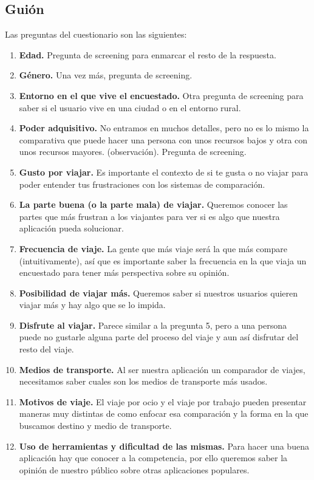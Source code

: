 \subsection{Guión}
Las preguntas del cuestionario son las siguientes:
\begin{enumerate}
    \item\textbf{Edad.} Pregunta de screening para enmarcar el resto de la respuesta.
    \item\textbf{Género.} Una vez más, pregunta de screening.
    \item\textbf{Entorno en el que vive el encuestado.} Otra pregunta de screening para saber si el usuario vive en una ciudad o en el entorno rural.
    \item\textbf{Poder adquisitivo.} No entramos en muchos detalles, pero no es lo mismo la comparativa que puede hacer una persona con unos recursos bajos y otra con unos recursos mayores. (observación). Pregunta de screening.
    \item\textbf{Gusto por viajar.} Es importante el contexto de si te gusta o no viajar para poder entender tus frustraciones con los sistemas de comparación.
    \item\textbf{La parte buena (o la parte mala) de viajar.} Queremos conocer las partes que más frustran a los viajantes para ver si es algo que nuestra aplicación pueda solucionar.
    \item\textbf{Frecuencia de viaje.} La gente que más viaje será la que más compare (intuitivamente), así que es importante saber la frecuencia en la que viaja un encuestado para tener más perspectiva sobre su opinión.
    \item\textbf{Posibilidad de viajar más.} Queremos saber si nuestros usuarios quieren viajar más y hay algo que se lo impida.
    \item\textbf{Disfrute al viajar.} Parece similar a la  pregunta 5, pero a una persona puede no gustarle alguna parte del proceso del viaje y aun así disfrutar del resto del viaje.
    \item\textbf{Medios de transporte.} Al ser nuestra aplicación un comparador de viajes, necesitamos saber cuales son los medios de transporte más usados.
    \item\textbf{Motivos de viaje.} El viaje por ocio y el viaje por trabajo pueden presentar maneras muy distintas de como enfocar esa comparación y la forma en la que buscamos destino y medio de transporte.
    \item\textbf{Uso de herramientas y dificultad de las mismas.} Para hacer  una buena aplicación hay que conocer a la competencia, por ello queremos saber la opinión de nuestro público sobre otras aplicaciones populares.

\end{enumerate}
